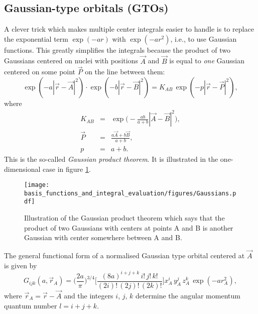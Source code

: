 \subsection{Gaussian-type orbitals (GTOs)}
A clever trick which makes multiple center integrals easier to handle is to replace the exponential
term $\exp(-a r)$ with $\exp(-a r^2)$, i.e., to use Gaussian functions. This greatly simplifies the
integrals because the product of two Gaussians centered on nuclei with positions
$\vec A$ and $\vec B$ is equal to \emph{one} Gaussian centered on some point $\vec P$ on
the line between them:
\begin{equation}
\label{eq:gaussian_product}
 \exp(-a|\vec r - \vec A|^2)\cdot \exp(-b|\vec r - \vec B|^2) = K_{AB}\,\exp(-p|\vec r - \vec P|^2),
\end{equation}
where
\begin{eqnarray}
 K_{AB} & = & \exp\Big(-\frac{ab}{a + b}|\vec A - \vec B|^2\Big), \\
 \vec P & = & \frac{a \vec A + b \vec B}{a + b}, \\
 p & = & a + b.
\end{eqnarray}
This is the so-called \emph{Gaussian product theorem}. It is illustrated in the one-dimensional case in figure \ref{fig:Gaussians}.
\begin{figure}
 \begin{center}
  \texttt{[image: basis\_functions\_and\_integral\_evaluation/figures/Gaussians.pdf]}
  \caption{Illustration of the Gaussian product theorem which says that the product of two Gaussians with centers at points A and B is another Gaussian
           with center somewhere between A and B.}
  \label{fig:Gaussians}
 \end{center}
\end{figure}


The general functional form of a normalised Gaussian type orbital 
centered at $\vec A$ is given by \cite{Cramer}
\begin{equation}
\label{eq:gaussian_primitive}
 G_{ijk}(a, \vec r_A) = \Big(\frac{2a}{\pi}\Big)^{3/4}\Big[\frac{(8a)^{i+j+k}\,i!\,j!\,k!}{(2i)!\,(2j)!\,(2k)!}\Big]x_A^i\,y_A^j\,z_A^k\,\exp(-a r_A^2),
\end{equation}
where $\vec r_A = \vec r - \vec A$ and the integers $i$, $j$, $k$ determine the angular momentum quantum number $l=i+j+k$. 

